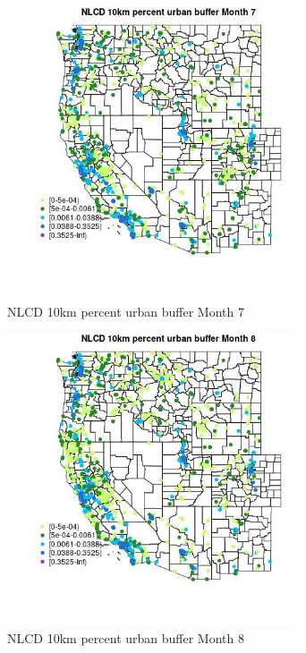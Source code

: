 \begin{figure} 
\centering  
\includegraphics[width=0.77\textwidth]{Code_Outputs/Report_ML_input_PM25_Step4_part_f_de_duplicated_aves_prioritize_24hr_obswNAs_MapObsMo7NLCD_10km_percent_urban_buffer.jpg} 
\caption{\label{fig:Report_ML_input_PM25_Step4_part_f_de_duplicated_aves_prioritize_24hr_obswNAsMapObsMo7NLCD_10km_percent_urban_buffer}NLCD 10km percent urban buffer Month 7} 
\end{figure} 
 

\begin{figure} 
\centering  
\includegraphics[width=0.77\textwidth]{Code_Outputs/Report_ML_input_PM25_Step4_part_f_de_duplicated_aves_prioritize_24hr_obswNAs_MapObsMo8NLCD_10km_percent_urban_buffer.jpg} 
\caption{\label{fig:Report_ML_input_PM25_Step4_part_f_de_duplicated_aves_prioritize_24hr_obswNAsMapObsMo8NLCD_10km_percent_urban_buffer}NLCD 10km percent urban buffer Month 8} 
\end{figure} 
 

